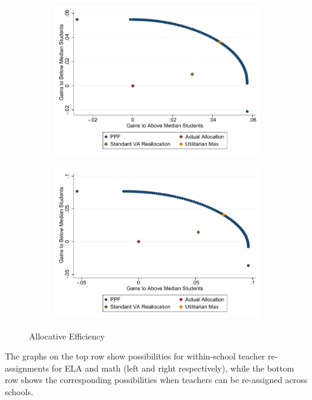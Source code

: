 \documentclass[12pt]{article}
\theoremstyle{definition}
\theoremstyle{definition}
\theoremstyle{definition}
\theoremstyle{definition}
\begin{document}
\begin{figure}[H]
    \begin{subfigure}[b]{0.45\textwidth}
        \includegraphics[width=1\textwidth]{Working_Paper/WP_Figures/AcrossSchoolReallocationELA.pdf}
    \end{subfigure}
    \begin{subfigure}[b]{0.45\textwidth}
        \includegraphics[width=1\textwidth]{Working_Paper/WP_Figures/AcrossSchoolReallocationMath.pdf}
    \end{subfigure}
    \caption{Allocative Efficiency}
    \label{fig:aloc_eff}
\end{figure}

The graphs on the top row show possibilities for within-school teacher re-assignments for ELA and math (left and right respectively), while the bottom row shows the corresponding possibilities when teachers can be re-assigned across schools. 
\end{document}
